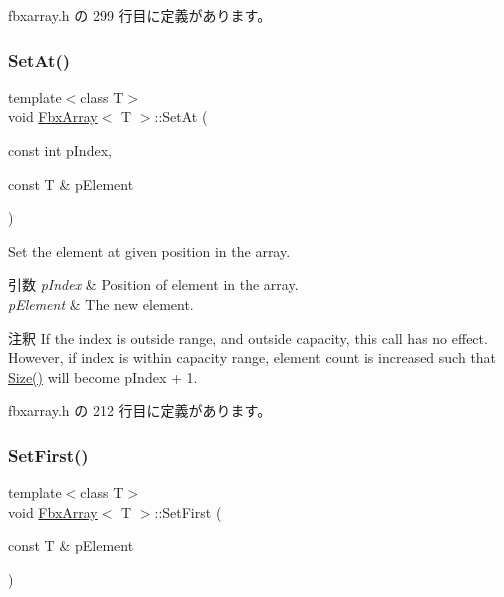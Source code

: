  fbxarray.\+h の 299 行目に定義があります。

\mbox{\label{class_fbx_array_a5229637f8e7dbee48fb8af9d03ecde14}} 
\subsubsection{\texorpdfstring{Set\+At()}{SetAt()}}
{\footnotesize\ttfamily template$<$class T$>$ \\
void \hyperlink{class_fbx_array}{Fbx\+Array}$<$ T $>$\+::Set\+At (\begin{DoxyParamCaption}\item[{const int}]{p\+Index,  }\item[{const T \&}]{p\+Element }\end{DoxyParamCaption})\hspace{0.3cm}{\ttfamily [inline]}}

Set the element at given position in the array. 
\begin{DoxyParams}{引数}
{\em p\+Index} & Position of element in the array. \\
\hline
{\em p\+Element} & The new element. \\
\hline
\end{DoxyParams}
\begin{DoxyRemark}{注釈}
If the index is outside range, and outside capacity, this call has no effect. However, if index is within capacity range, element count is increased such that \hyperlink{class_fbx_array_aa76a0ceaf4b13a2acec7c0cdd1c08362}{Size()} will become p\+Index + 1. 
\end{DoxyRemark}


 fbxarray.\+h の 212 行目に定義があります。

\mbox{\label{class_fbx_array_a774337e192792ec62ec89739399860f2}} 
\subsubsection{\texorpdfstring{Set\+First()}{SetFirst()}}
{\footnotesize\ttfamily template$<$class T$>$ \\
void \hyperlink{class_fbx_array}{Fbx\+Array}$<$ T $>$\+::Set\+First (\begin{DoxyParamCaption}\item[{const T \&}]{p\+Element }\end{DoxyParamCaption})\hspace{0.3cm}{\ttfamily [inline]}}

